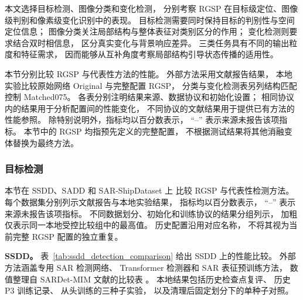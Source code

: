 \documentclass[journal]{IEEEtran}
\begin{document}
本文选择目标检测、图像分类和变化检测，
分别考察 RGSP 在目标级定位、图像级判别和像素级变化识别中的表现。
目标检测需要同时保持目标的判别性与空间定位信息；
图像分类关注局部结构与整体表征对类别区分的作用；
变化检测则要求结合双时相信息，
区分真实变化与背景响应差异。
三类任务具有不同的输出粒度和特征需求，
因而能够从互补角度考察局部结构引导状态传播的适用性。

本节分别比较 RGSP 与代表性方法的性能。
外部方法采用文献报告结果，
本地实验比较原始网络 Original 与完整配置 RGSP，
分类与变化检测表另列结构匹配控制 Matched075。
各表分别注明结果来源、数据协议和初始化设置；
相同协议内的结果用于分析配置间的性能变化，
不同协议的文献结果用于提供已有方法的性能参照。
除特别说明外，指标均以百分数表示，
``--'' 表示来源未报告该项指标。
本节中的 RGSP 均指预先定义的完整配置，
不根据测试结果将其他消融变体替换为最终方法。

\subsubsection{目标检测}
\label{sec:detection_results}

本节在 SSDD、SADD 和 SAR-ShipDataset 上
比较 RGSP 与代表性检测方法。
每个数据集分别列示文献报告与本地实验结果，
指标均以百分数表示，
``--'' 表示来源未报告该项指标。
不同数据划分、初始化和训练协议的结果分组列示，
加粗仅表示同一本地受控比较组中的最高值。
历史配置沿用对应名称，
不将其视为当前完整 RGSP 配置的独立重复。

\textbf{SSDD。}
表~\ref{tab:ssdd_detection_comparison}
给出 SSDD 上的性能比较。
外部方法涵盖专用 SAR 检测网络、
Transformer 检测器和 SAR 表征预训练方法，
数值整理自 SARDet-MIM 文献的比较表
\cite{sardetmim2026}。
本地结果包括历史检查点复评、
历史 P3 训练记录、
从头训练的三种子实验，
以及清理后固定划分下的单种子对照。
\end{document}
